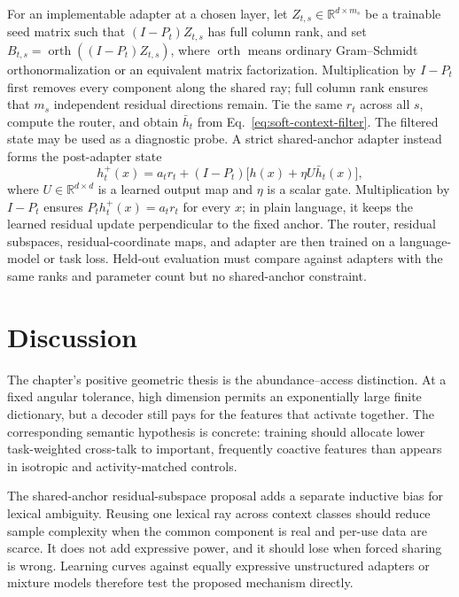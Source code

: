 \documentclass[
  aps,
  reprint,
  superscriptaddress,
  floatfix,
  nofootinbib,
  longbibliography
]{revtex4-2}
\newcommand{\R}{\mathbb{R}}
\begin{document}
For an implementable adapter at a chosen layer, let
$Z_{t,s}\in\R^{d\times m_s}$ be a trainable seed matrix such that
$(I-P_t)Z_{t,s}$ has full column rank, and set
$B_{t,s}=\operatorname{orth}((I-P_t)Z_{t,s})$, where
$\operatorname{orth}$ means ordinary Gram--Schmidt orthonormalization or an
equivalent matrix factorization.
Multiplication by $I-P_t$ first removes every component along the shared ray;
full column rank ensures that $m_s$ independent residual directions remain.
Tie the same $r_t$ across all $s$, compute the router, and obtain $\bar h_t$
from Eq.~\eqref{eq:soft-context-filter}.  The filtered state may be used as a
diagnostic probe.  A strict shared-anchor adapter instead forms the
post-adapter state
%
\begin{equation}
\label{eq:strict-anchor-update}
h_t^+(x)=a_t r_t+(I-P_t)\bigl[h(x)+\eta U\bar h_t(x)\bigr],
\end{equation}
%
where $U\in\R^{d\times d}$ is a learned output map and $\eta$ is a scalar gate.
Multiplication by $I-P_t$ ensures $P_t h_t^+(x)=a_t r_t$ for every $x$; in plain
language, it keeps the learned residual update perpendicular to the fixed
anchor.  The router, residual subspaces, residual-coordinate maps, and adapter are then
trained on a language-model or task loss.  Held-out evaluation must compare
against adapters with the same ranks and parameter count but no shared-anchor
constraint.

\section{Discussion}
\label{sec:discussion}

The chapter's positive geometric thesis is the abundance--access distinction.
At a fixed angular tolerance, high dimension permits an exponentially large
finite dictionary, but a decoder still pays for the features that activate
together.  The corresponding semantic hypothesis is concrete: training should
allocate lower task-weighted cross-talk to important, frequently coactive
features than appears in isotropic and activity-matched controls.

The shared-anchor residual-subspace proposal adds a separate inductive bias for lexical
ambiguity.  Reusing one lexical ray across context classes should reduce sample
complexity when the common component is real and per-use data are scarce.
It does not add expressive power, and it should lose when forced sharing is
wrong.  Learning curves against equally expressive unstructured adapters or
mixture models therefore test the proposed mechanism directly.
\end{document}
